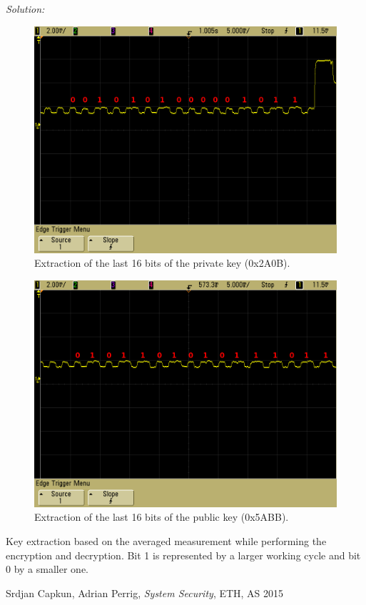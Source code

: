 \documentclass[a4paper,11pt]{article}
\newenvironment{solution}%
{\par{\noindent\small\textit{Solution:}}\vspace{-12pt}\begin{framed}}%
{\end{framed}\par}
\begin{document}
\begin{enumerate}[(a)]
\begin{solution}
\makeatletter
\begin{center}
\def\@captype{figure}

\begin{subfigure}[b]{0.7\textwidth}
	\includegraphics[width=\textwidth]{screenshots/print_006_bits.png}
	\caption{Extraction of the last 16 bits of the private key (0x2A0B).}
	\label{fig:private_key}
\end{subfigure}
\begin{subfigure}[b]{0.7\textwidth}
	\includegraphics[width=\textwidth]{screenshots/print_003_bits.png}
	\caption{Extraction of the last 16 bits of the public key (0x5ABB).}
	\label{fig:public_key}
\end{subfigure}

\caption{Key extraction based on the averaged measurement while performing the encryption and decryption. Bit 1 is represented by a larger working cycle and bit 0 by a smaller one.}
\label{fig:key_extraction}

\end{center}
\makeatother



\end{solution}\fi

\end{enumerate}

\begin{thebibliography}{---}
        Srdjan Capkun, Adrian Perrig,
        \emph{System Security},
        ETH, AS 2015
\end{thebibliography}
\end{document}
